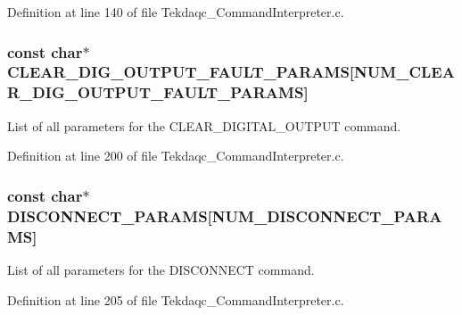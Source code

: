 Definition at line 140 of file Tekdaqc\-\_\-\-Command\-Interpreter.\-c.

\hypertarget{group__command__interpreter_gae3e466b9002fbb2a3b72a14091736c14}{
\subsubsection[{C\-L\-E\-A\-R\-\_\-\-D\-I\-G\-\_\-\-O\-U\-T\-P\-U\-T\-\_\-\-F\-A\-U\-L\-T\-\_\-\-P\-A\-R\-A\-M\-S}]{\setlength{\rightskip}{0pt plus 5cm}const char$\ast$ C\-L\-E\-A\-R\-\_\-\-D\-I\-G\-\_\-\-O\-U\-T\-P\-U\-T\-\_\-\-F\-A\-U\-L\-T\-\_\-\-P\-A\-R\-A\-M\-S\mbox{[}{\bf N\-U\-M\-\_\-\-C\-L\-E\-A\-R\-\_\-\-D\-I\-G\-\_\-\-O\-U\-T\-P\-U\-T\-\_\-\-F\-A\-U\-L\-T\-\_\-\-P\-A\-R\-A\-M\-S}\mbox{]}}}\label{group__command__interpreter_gae3e466b9002fbb2a3b72a14091736c14}
List of all parameters for the C\-L\-E\-A\-R\-\_\-\-D\-I\-G\-I\-T\-A\-L\-\_\-\-O\-U\-T\-P\-U\-T command. 

Definition at line 200 of file Tekdaqc\-\_\-\-Command\-Interpreter.\-c.

\hypertarget{group__command__interpreter_ga4c2b766d3384cd7cb0ed759dab8fc4ac}{
\subsubsection[{D\-I\-S\-C\-O\-N\-N\-E\-C\-T\-\_\-\-P\-A\-R\-A\-M\-S}]{\setlength{\rightskip}{0pt plus 5cm}const char$\ast$ D\-I\-S\-C\-O\-N\-N\-E\-C\-T\-\_\-\-P\-A\-R\-A\-M\-S\mbox{[}{\bf N\-U\-M\-\_\-\-D\-I\-S\-C\-O\-N\-N\-E\-C\-T\-\_\-\-P\-A\-R\-A\-M\-S}\mbox{]}}}\label{group__command__interpreter_ga4c2b766d3384cd7cb0ed759dab8fc4ac}
List of all parameters for the D\-I\-S\-C\-O\-N\-N\-E\-C\-T command. 

Definition at line 205 of file Tekdaqc\-\_\-\-Command\-Interpreter.\-c.

